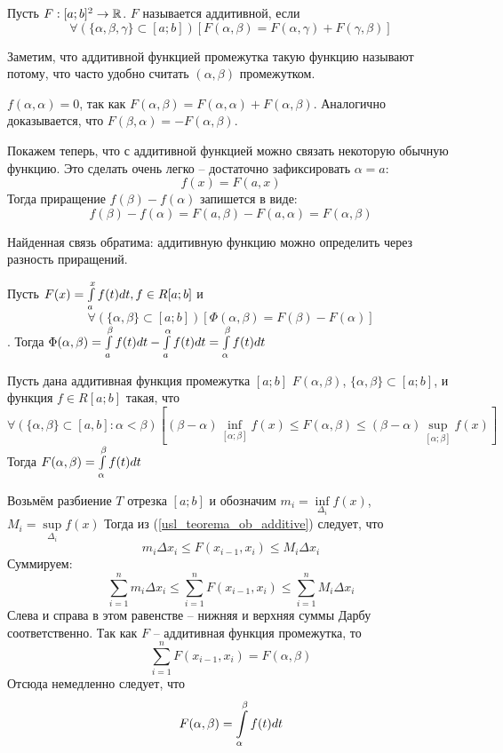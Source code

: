 \begin{opred}
Пусть $F:[a;b]^2 \to \mathbb{R}$. $F$ называется аддитивной, если
\begin{equation}\label{opr_additive}
\forall(\{\alpha,\beta,\gamma\}\subset[a;b])[F(\alpha,\beta)=F(\alpha,\gamma)+F(\gamma,\beta)]
\end{equation}
\end{opred}
Заметим, что аддитивной функцией промежутка такую функцию называют потому, что часто удобно считать $(\alpha,\beta)$ промежутком.

\begin{zamech}
$f(\alpha,\alpha)=0$, так как $F(\alpha,\beta)=F(\alpha,\alpha)+F(\alpha,\beta)$.
Аналогично доказывается, что $F(\beta,\alpha)=-F(\alpha,\beta)$.
\end{zamech}

Покажем теперь, что с аддитивной функцией можно связать некоторую обычную функцию.
Это сделать очень легко -- достаточно зафиксировать $\alpha=a$:
$$
f(x)=F(a,x)
$$
Тогда приращение $f(\beta)-f(\alpha)$ запишется в виде:
$$
f(\beta)-f(\alpha)=F(a,\beta)-F(a,\alpha)=F(\alpha,\beta)
$$

Найденная связь обратима: аддитивную функцию можно определить через разность приращений.

\begin{primer}
Пусть $F(x)=\int\limits_a^x f(t)dt, f\in R[a;b]$ и 
$$
\forall(\{\alpha,\beta\}\subset[a;b])[\Phi(\alpha,\beta)=F(\beta)-F(\alpha)]
$$.
Тогда $\Phi(\alpha,\beta)=\int\limits_a^\beta f(t)dt-\int\limits_a^\alpha f(t)dt=\int\limits_\alpha^\beta f(t)dt$
\end{primer}

\begin{teorema}
Пусть дана аддитивная функция промежутка $[a;b]$ $F(\alpha,\beta)$, $\{\alpha,\beta\}\subset[a;b]$,
и функция $f\in R[a;b]$ такая, что
\begin{equation}\label{usl_teorema_ob_additive}
\forall(\{\alpha,\beta\}\subset[a,b]:\alpha<\beta)
[(\beta-\alpha)\inf\limits_{[\alpha;\beta]}f(x)\leq F(\alpha,\beta)\leq(\beta-\alpha)\sup\limits_{[\alpha;\beta]}f(x)]
\end{equation}
Тогда $F(\alpha,\beta)=\int\limits_\alpha^\beta f(t)dt$
\end{teorema}
\dokvo
Возьмём разбиение $T$ отрезка $[a;b]$ и обозначим $m_i=\inf\limits_{\Delta_i}f(x)$, $M_i=\sup\limits_{\Delta_i}f(x)$
Тогда из (\ref{usl_teorema_ob_additive}) следует, что
$$
m_i\Delta x_i\leq F(x_{i-1},x_i)\leq M_i\Delta x_i
$$
Суммируем:
$$
\sum_{i=1}^n m_i\Delta x_i\leq \sum_{i=1}^n F(x_{i-1},x_i)\leq \sum_{i=1}^n M_i\Delta x_i
$$
Слева и справа в этом равенстве -- нижняя и верхняя суммы Дарбу соответственно.
Так как $F$ -- аддитивная функция промежутка, то 
$$
\sum_{i=1}^n F(x_{i-1},x_i)=F(\alpha,\beta)
$$
Отсюда немедленно следует, что 
$$
F(\alpha,\beta)=\int\limits_\alpha^\beta f(t)dt
$$
\dokno

